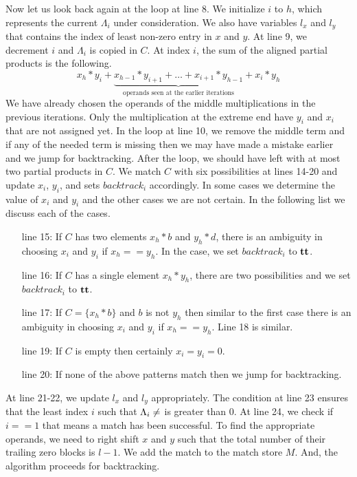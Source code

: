 Now let us look back again at the loop at line 8.
%
We initialize $i$ to $h$, which represents the current $\Lambda_i$ under
consideration.
%
We also have variables $l_x$ and $l_y$ that contains the index of
least non-zero entry in $x$ and $y$.
%
At line 9, we decrement $i$ and $\Lambda_i$ is copied in $C$.
%
At index $i$, the sum of the aligned partial products is the following.
$$
x_{h}*y_{i} + \underbrace{x_{h-1}*y_{i+1} + \dots + x_{i+1}*y_{h-1}}_{\text{operands seen at the earlier iterations}} + x_{i}*y_{h}
$$
We have already chosen the operands of the middle multiplications in the previous iterations.
%
Only the multiplication at the extreme end have $y_i$ and $x_i$ that are
not assigned yet.
%
In the loop at line 10, we remove the middle term and if any of the needed
term is missing then we may have made a mistake earlier and we jump for
backtracking.
%
After the loop, we should have left with at most two partial products in $C$.
%
We match $C$ with six possibilities at lines 14-20 and
update $x_i$, $y_i$, and sets $backtrack_i$ accordingly.
%
In some cases we determine the value of $x_i$ and $y_i$ and the other
cases we are not certain. 
%
In the following list we discuss each of the cases.
%
\begin{itemize}
\item[line 15:] If $C$ has two elements $x_h*b$ and $y_h*d$,
there is an ambiguity in choosing $x_i$ and $y_i$
if $x_h == y_h$.
%
In the case, we set $backtrack_i$ to $\mathbf{tt}$.
\item[line 16:] If $C$ has a single element $x_h*y_h$, there  
are two possibilities and we set $backtrack_i$ to $\mathbf{tt}$.
\item[line 17:] If $C = \{x_h*b\}$ and $b$ is not $y_h$ then 
  similar to the first case there is an ambiguity in
  choosing $x_i$ and $y_i$ if $x_h == y_h$. Line 18 is similar.
\item[line 19:] If $C$ is empty then certainly $x_i = y_i = 0$.
\item[line 20:] If none of the above patterns match then we jump for
  backtracking.
\end{itemize}
%
At line 21-22, we update $l_x$ and $l_y$ appropriately.
%
The condition at line 23 ensures that the least index $i$ such that
$\Lambda_i \neq \empty$ is greater than 0.    
%
At line 24, we check if $i==1$ that means a match has been successful.
%
To find the appropriate operands, we need to right shift $x$ and $y$
such that the total number of their trailing zero blocks is $l-1$.
%
We add the match to the match store $M$.
%
And, the algorithm proceeds for backtracking.

